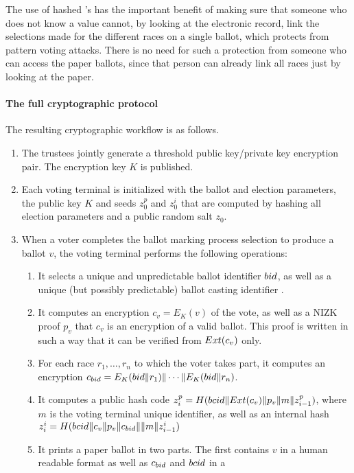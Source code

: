 The use of hashed \bid's has the important benefit of making sure that
someone who does not know a \bid value cannot, by looking at the
electronic record, link the selections made for the different races on
a single ballot, which protects from pattern voting attacks. There is
no need for such a protection from someone who can access the paper
ballots, since that person can already link all races just by looking
at the paper.

\paragraph{The full cryptographic protocol}
\label{sec:full-protocol}
The resulting cryptographic workflow is as follows. 
\begin{enumerate}
\item The trustees jointly generate a threshold public key/private key
  encryption pair. The encryption key $K$ is published.
\item Each voting terminal is initialized with the ballot and election
  parameters, the public key $K$ and seeds $z_0^p$ and $z_0^i$ that
  are computed by hashing all election parameters and a public random
  salt $z_0$.
\item When a voter completes the ballot marking process selection
  to produce a ballot $v$, the voting terminal performs the following operations: 
  \begin{enumerate}
  \item It selects a unique and unpredictable ballot identifier
    ${bid}$, as well as a unique (but possibly predictable) ballot
    casting identifier \bcid.
  \item It computes an encryption $c_v = E_K(v)$ of the vote, as well
    as a NIZK proof $p_v$ that $c_v$ is an encryption of a valid
    ballot. This proof is written in such a way that it can be
    verified from $Ext(c_v)$ only.
  \item For each race $r_1, \dots, r_n$ to which the voter takes part, it computes
    an encryption $c_{bid} = E_K({bid} \| r_1) \| \cdots \| E_K({bid} \| r_n)$. 
  \item It computes a public hash code $z^p_i = H({bcid} \| Ext(c_v) \| p_v \|
    m \| z^p_{i-1})$, where $m$ is the voting terminal unique
    identifier, as well as an internal hash $z^i_i = H({bcid} \| c_v \| p_v \|
    c_{bid} \| \| m \| z_{i-1}^i)$
  \item It prints a paper ballot in two parts. The first contains $v$
    in a human readable format as well as $c_{bid}$ and ${bcid}$ in a

\end{enumerate}
\end{enumerate}
